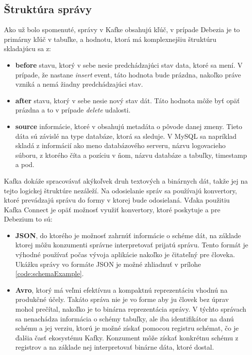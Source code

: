 \subsection{Štruktúra správy} \label{ssec:message_structure}
Ako už bolo spomenuté, správy v Kafke obsahujú kľúč, v prípade Debezia je to primárny kľúč v tabuľke, a hodnotu, ktorá má komplexnejšiu štruktúru skladajúcu sa z:
\begin{itemize}
\item \textbf{before} stavu, ktorý v sebe nesie predchádzajúci stav data, ktoré sa mení. V prípade, že nastane \textit{insert} event, táto hodnota bude prázdna, nakoľko práve vzniká a nemá žiadny predchádzajúci stav.
\item \textbf{after} stavu, ktorý v sebe nesie nový stav dát. Táto hodnota môže byť opäť prázdna a to v prípade \textit{delete} udalosti.
\item \textbf{source} informácie, ktoré v obsahujú metadáta o pôvode danej zmeny. Tieto dáta sú závislé na type databáze, ktorá sa sleduje. V MySQL sa napríklad skladá z informácií ako meno databázového serveru, názvu logovacieho súboru, z ktorého číta a pozíciu v ňom, názvu databáze a tabuľky, timestamp a pod.
\end{itemize}

Kafka dokáže spracovávať akýkoľvek druh textových a binárnych dát, takže jej na tejto logickej štruktúre nezáleží. Na odosielanie správ sa používajú konvertory, ktoré prevádzajú správu do formy v ktorej bude odosielaná. Vďaka použitiu Kafka Connect je opäť možnosť využiť konvertory, ktoré poskytuje a pre Debezium to sú:
\begin{itemize}
\item \textbf{JSON}, do ktorého je možnosť zahrnúť informácie o schéme dát, na základe ktorej môžu konzumenti správne interpretovať prijatú správu. Tento formát je výhodné používať počas vývoja aplikácie nakoľko je čitateľný pre človeka. Ukážku správy vo formáte JSON je možné zhliadnuť v prílohe \ref{code:schemaExample}.
\item \textbf{Avro}, ktorý má veľmi efektívnu a kompaktnú reprezentáciu vhodnú na produkčné účely. Takáto správa nie je vo forme aby ju človek bez úprav mohol prečítal, nakoľko je to binárna reprezentácia správy. V týchto správach sa nenachádza informácia o schémy tabuľky, ale iba identifikátor na danú schému a jej verziu, ktorú je možné získať pomocou registru schémat, čo je ďalšia časť ekosystému Kafky. Konzument môže získať konkrétnu schému z registrov a na základe nej interpretovať binárne dáta, ktoré dostal.
\end{itemize}

